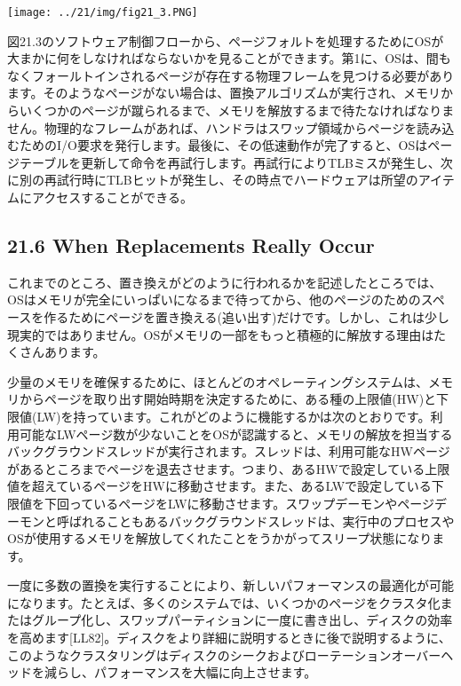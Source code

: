\texttt{[image: ../21/img/fig21\_3.PNG]}

図21.3のソフトウェア制御フローから、ページフォルトを処理するためにOSが大まかに何をしなければならないかを見ることができます。第1に、OSは、間もなくフォールトインされるページが存在する物理フレームを見つける必要があります。そのようなページがない場合は、置換アルゴリズムが実行され、メモリからいくつかのページが蹴られるまで、メモリを解放するまで待たなければなりません。物理的なフレームがあれば、ハンドラはスワップ領域からページを読み込むためのI/O要求を発行します。最後に、その低速動作が完了すると、OSはページテーブルを更新して命令を再試行します。再試行によりTLBミスが発生し、次に別の再試行時にTLBヒットが発生し、その時点でハードウェアは所望のアイテムにアクセスすることができる。

\hypertarget{when-replacements-really-occur}{%
\subsection*{21.6 When Replacements Really
Occur}\label{when-replacements-really-occur}}

これまでのところ、置き換えがどのように行われるかを記述したところでは、OSはメモリが完全にいっぱいになるまで待ってから、他のページのためのスペースを作るためにページを置き換える(追い出す)だけです。しかし、これは少し現実的ではありません。OSがメモリの一部をもっと積極的に解放する理由はたくさんあります。

少量のメモリを確保するために、ほとんどのオペレーティングシステムは、メモリからページを取り出す開始時期を決定するために、ある種の上限値(HW)と下限値(LW)を持っています。これがどのように機能するかは次のとおりです。利用可能なLWページ数が少ないことをOSが認識すると、メモリの解放を担当するバックグラウンドスレッドが実行されます。スレッドは、利用可能なHWページがあるところまでページを退去させます。つまり、あるHWで設定している上限値を超えているページをHWに移動させます。また、あるLWで設定している下限値を下回っているページをLWに移動させます。スワップデーモンやページデーモンと呼ばれることもあるバックグラウンドスレッドは、実行中のプロセスやOSが使用するメモリを解放してくれたことをうかがってスリープ状態になります。

一度に多数の置換を実行することにより、新しいパフォーマンスの最適化が可能になります。たとえば、多くのシステムでは、いくつかのページをクラスタ化またはグループ化し、スワップパーティションに一度に書き出し、ディスクの効率を高めます{[}LL82{]}。ディスクをより詳細に説明するときに後で説明するように、このようなクラスタリングはディスクのシークおよびローテーションオーバーヘッドを減らし、パフォーマンスを大幅に向上させます。

